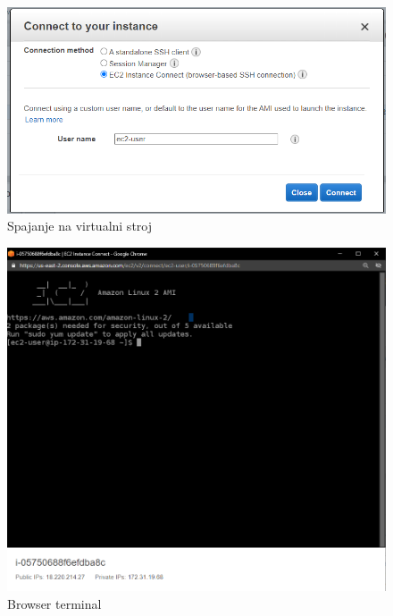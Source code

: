 			\begin{figure}[h]
				\includegraphics[width=\textwidth]{slike/deployment_slike/instanceConnect.png}
				\centering
				\caption{Spajanje na virtualni stroj}
			\end{figure}
		
			\begin{figure}[h]
				\includegraphics[width=\textwidth]{slike/deployment_slike/browserTerminal.png}
				\centering
				\caption{Browser terminal}
			\end{figure}
			
			\eject 